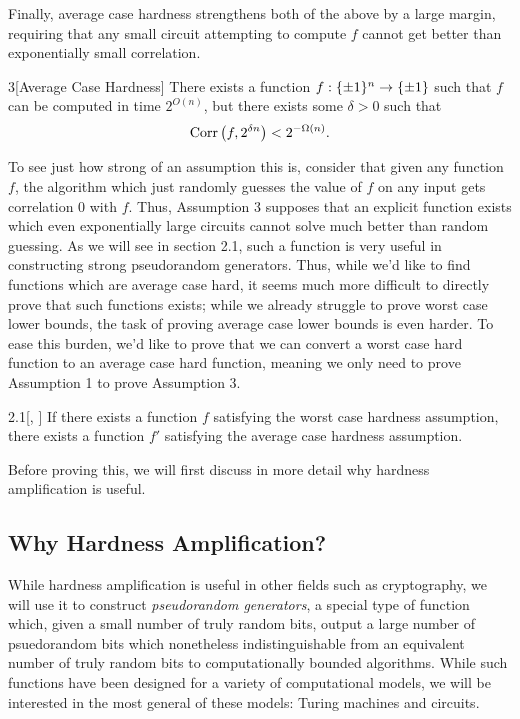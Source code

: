 \documentclass[11pt]{article}
\begin{document}
Finally, average case hardness strengthens both of the above by a large margin, requiring that any small circuit attempting to compute $f$ cannot get better than exponentially small correlation.

\begin{assumption}{3}[Average Case Hardness] \label{a-3}
    There exists a function $f : \{\pm 1\}^n \rightarrow \{\pm 1\}$ such that $f$ can be computed in time $2^{O(n)}$, but there exists some $\delta > 0$ such that 
    \begin{equation*}
        \mathrm{Corr}\left(f, 2^{\delta n}\right) < 2^{-\Omega(n)}.
    \end{equation*}
\end{assumption}

To see just how strong of an assumption this is, consider that given any function $f$, the algorithm which just randomly guesses the value of $f$ on any input gets correlation $0$ with $f$. Thus, Assumption 3 supposes that an explicit function exists which even exponentially large circuits cannot solve much better than random guessing. As we will see in section 2.1, such a function is very useful in constructing strong pseudorandom generators. Thus, while we'd like to find functions which are average case hard, it seems much more difficult to directly prove that such functions exists; while we already struggle to prove worst case lower bounds, the task of proving average case lower bounds is even harder. To ease this burden, we'd like to prove that we can convert a worst case hard function to an average case hard function, meaning we only need to prove Assumption 1 to prove Assumption 3.

\begin{theorem}{2.1}[\cite{iw97}, \cite{STV99}]\label{t-2-1}
    If there exists a function $f$ satisfying the worst case hardness assumption, there exists a function $f'$ satisfying the average case hardness assumption.
\end{theorem}

Before proving this, we will first discuss in more detail why hardness amplification is useful.


\subsection{Why Hardness Amplification?}

While hardness amplification is useful in other fields such as cryptography, we will use it to construct \emph{pseudorandom generators}, a special type of function which, given a small number of truly random bits, output a large number of psuedorandom bits which nonetheless indistinguishable from an equivalent number of truly random bits to computationally bounded algorithms. While such functions have been designed for a variety of computational models, we will be interested in the most general of these models: Turing machines and circuits.
\end{document}
